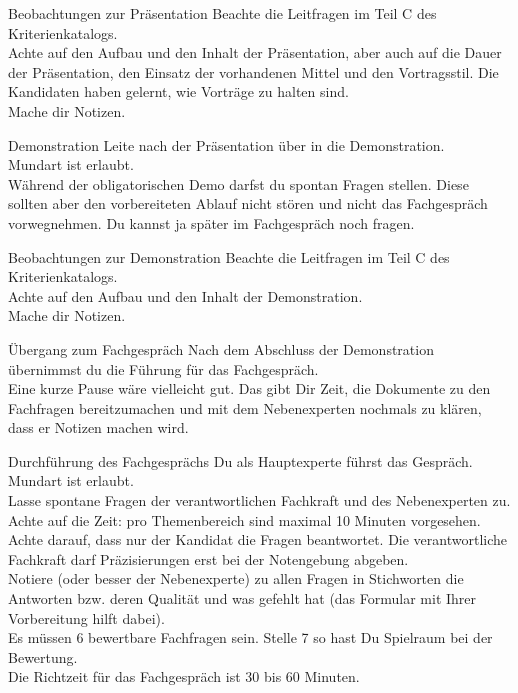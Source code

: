 \begin{taskitem}{Beobachtungen zur Präsentation}
  Beachte die Leitfragen im Teil C des Kriterienkatalogs.\\
  Achte auf den Aufbau und den Inhalt der Präsentation, aber auch auf die Dauer der Präsentation, den Einsatz der vorhandenen Mittel und den Vortragsstil. Die Kandidaten haben gelernt, wie Vorträge zu halten sind.\\
  Mache dir Notizen.
\end{taskitem}
\newpage
\begin{taskitem}{Demonstration}
  Leite nach der Präsentation über in die Demonstration.\\Mundart ist erlaubt.\\
  Während der obligatorischen Demo darfst du spontan Fragen stellen. Diese sollten aber den vorbereiteten Ablauf nicht stören und nicht das Fachgespräch vorwegnehmen. Du kannst ja später im Fachgespräch noch fragen.
\end{taskitem}
\begin{taskitem}{Beobachtungen zur Demonstration}
  Beachte die Leitfragen im Teil C des Kriterienkatalogs.\\
  Achte auf den Aufbau und den Inhalt der Demonstration.\\
  Mache dir Notizen.
\end{taskitem}
\begin{taskitemwithoutcomment}{Übergang zum Fachgespräch}
  Nach dem Abschluss der Demonstration übernimmst du die Führung für das Fachgespräch.\\Eine kurze Pause wäre vielleicht gut. Das gibt Dir Zeit, die Dokumente zu den Fachfragen bereitzumachen und mit dem Nebenexperten nochmals zu klären, dass er Notizen machen wird.
\end{taskitemwithoutcomment}
\begin{taskitemwithoutcomment}{Durchführung des Fachgesprächs}
  Du als Hauptexperte führst das Gespräch. Mundart ist erlaubt.\\Lasse spontane Fragen der verantwortlichen Fachkraft und des Nebenexperten zu.\\Achte auf die Zeit: pro Themenbereich sind maximal 10 Minuten vorgesehen.\\Achte darauf, dass nur der Kandidat die Fragen beantwortet. Die verantwortliche Fachkraft darf Präzisierungen erst bei der Notengebung abgeben.\\Notiere (oder besser der Nebenexperte) zu allen Fragen in Stichworten die Antworten bzw. deren Qualität und was gefehlt hat (das Formular mit Ihrer Vorbereitung hilft dabei).\\Es müssen 6 bewertbare Fachfragen sein. Stelle 7 so hast Du Spielraum bei der Bewertung.\\Die Richtzeit für das Fachgespräch ist 30 bis 60 Minuten.
\end{taskitemwithoutcomment}
